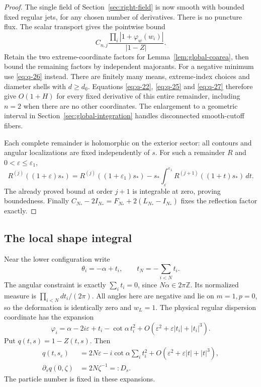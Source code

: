 \documentclass[11pt]{article}
\numberwithin{equation}{section}
\theoremstyle{remark}\newtheorem{remark}[theorem]{Remark}
\begin{document}
\begin{proof}
The single field of Section~\ref{sec:right-field} is now
smooth with bounded fixed regular jets, for any chosen
number of derivatives. There is no puncture flux. The
scalar transport gives the pointwise bound
\[
 C_{n,j}\frac{\prod_i|1+\varphi_w(w_i)|}{|1-Z|}.
\]
Retain the two extreme-coordinate factors for
Lemma~\ref{lem:global-coarea}, then bound the remaining factors
by independent majorants.
For a negative minimum use \eqref{eq:q-26} instead.
There are finitely many means, extreme-index choices and
diameter shells with $d\ge d_0$. Equations
\eqref{eq:q-22}, \eqref{eq:q-25} and \eqref{eq:q-27}
therefore give $O(1+H)$ for every fixed derivative of this
entire remainder, including $n=2$ when there are no other
coordinates. The enlargement to a geometric interval
in Section~\ref{sec:global-integration} handles
disconnected smooth-cutoff fibers.

Each complete remainder is holomorphic on the exterior
sector: all contours and angular localizations are fixed
independently of $s$. For such a remainder $R$ and
$0<\varepsilon\le\varepsilon_1$,
\[
 R^{(j)}((1+\varepsilon)s_*)
 =R^{(j)}((1+\varepsilon_1)s_*)
   -s_*\int_\varepsilon^{\varepsilon_1}
              R^{(j+1)}((1+t)s_*)\,dt.
\]
The already proved bound at order $j+1$ is integrable at
zero, proving boundedness. Finally
$C_{N_*}-2I_{N_*}=F_{N_*}+2(L_{N_*}-I_{N_*})$ fixes the
reflection factor exactly.
\end{proof}

\subsection{The local shape integral}

Near the lower configuration write
\[
 \theta_i=-\alpha+t_i,\qquad
 t_N=-\sum_{i<N}t_i.
\]
The angular constraint is exactly $\sum_i t_i=0$, since
$N\alpha\in2\pi\mathbb Z$.  Its normalized measure is
$\prod_{i<N}dt_i/(2\pi)$.  All angles here are negative and lie on $m=1,p=0$,
so the deformation is identically zero and $w_L=1$.
The physical regular dispersion coordinate has the expansion
\[
 \varphi_i
  =\alpha-2i\varepsilon+t_i-\cot\alpha\,t_i^2
    +O(\varepsilon^2+\varepsilon|t_i|+|t_i|^3).
\]
Put $q(t,s)=1-Z(t,s)$.  Then
\begin{equation}\label{eq:single-q}
 \begin{split}
 q(t,s_\varepsilon)
  &=2N\varepsilon-i\cot\alpha\sum_i t_i^2
      +O(\varepsilon^2+\varepsilon|t|+|t|^3),\\
 \partial_s q(0,\zeta)&=2N\zeta^{-1}=:D_s.
 \end{split}
\end{equation}
The particle number is fixed in these expansions.
\end{document}
